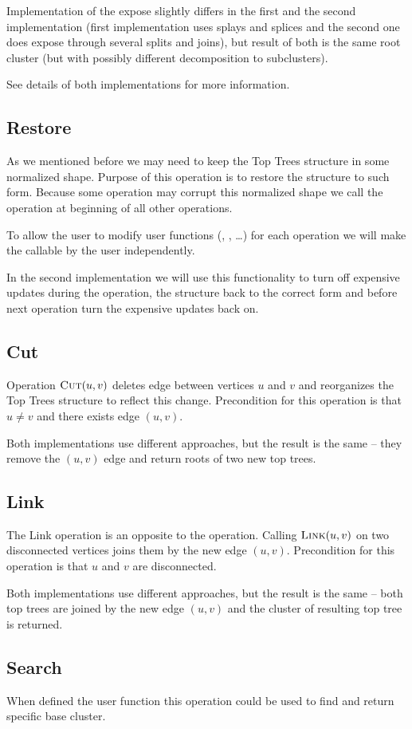 Implementation of the expose slightly differs in the first and the second
implementation (first implementation uses splays and splices and the second one
does expose through several splits and joins), but result of both is the
same root cluster (but with possibly different decomposition to subclusters).

See details of both implementations for more information.

\subsection{\sc Restore}

As we mentioned before we may need to keep the Top Trees structure in some
normalized shape. Purpose of this operation is to restore the structure
to such form. Because some operation may corrupt this normalized shape we
call the \Restore{} operation at beginning of all other operations.

To allow the user to modify user functions (\Split, \Join, \dots) for each
operation we will make the \Restore{} callable by the user independently.

In the second implementation we will use this functionality to turn off
expensive updates during the \Expose{} operation, \Restore{} the structure back to the
correct form and before next operation turn the expensive updates back on.

\subsection{\sc Cut}

Operation $\hbox{\sc Cut}(u,v)$ deletes edge between vertices $u$ and $v$ and reorganizes
the Top Trees structure to reflect this change. Precondition for this operation
is that $u\ne v$ and there exists edge $(u,v)$.

Both implementations use different approaches, but the result is the same --
they remove the $(u,v)$ edge and return roots of two new top trees.

\subsection{\sc Link}

The Link operation is an opposite to the \Cut{} operation. Calling $\hbox{\sc Link}(u,v)$ on
two disconnected vertices joins them by the new edge $(u,v)$. Precondition for
this operation is that $u$ and $v$ are disconnected.

Both implementations use different approaches, but the result is the same --
both top trees are joined by the new edge $(u,v)$ and the cluster of resulting
top tree is returned.

\subsection{\sc Search}

When defined the \Choose{} user function this operation could be used to find
and return specific base cluster.

